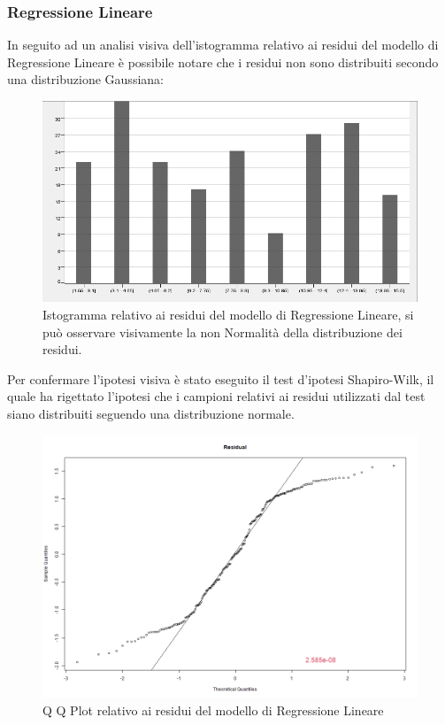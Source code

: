 \documentclass[12pt, a4paper, twocolumn]{article} %
\begin{document}
\subsubsection{Regressione Lineare}
In seguito ad un analisi visiva dell'istogramma relativo ai residui del modello di Regressione Lineare è possibile notare che i residui non sono distribuiti secondo una distribuzione Gaussiana:
\begin{figure}[H]
  \includegraphics[scale=0.35]{./Immagini/hist-linear-regression.png}
  \caption{Istogramma relativo ai residui del modello di Regressione Lineare, si può osservare visivamente la non Normalità della distribuzione dei residui.}
\end{figure}
Per confermare l'ipotesi visiva è stato eseguito il test d'ipotesi Shapiro-Wilk, il quale ha rigettato l'ipotesi che i campioni relativi ai residui utilizzati dal test siano distribuiti seguendo una distribuzione normale.
\begin{figure}[H]
  \includegraphics[scale=0.25]{./Immagini/qq-plot-linear-regression.png}
  \caption{Q Q Plot relativo ai residui del modello di Regressione Lineare}
\end{figure}
\end{document}
